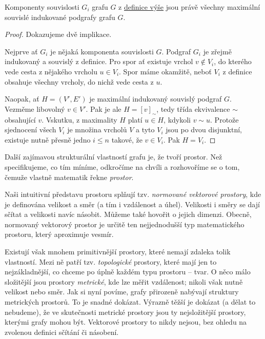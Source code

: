 \begin{observation}
 Komponenty souvislosti $G_i$ grafu $G$ z
 \hyperref[def:komponenta-souvislosti]{definice výše} jsou právě všechny
 maximální souvislé indukované podgrafy grafu $G$.
\end{observation}
\begin{proof}
 Dokazujeme dvě implikace.

 Nejprve ať $G_i$ je nějaká komponenta souvislosti $G$. Podgraf $G_i$ je zřejmě
 indukovaný a souvislý z definice. Pro spor ať existuje vrchol $v \notin V_i$,
 do kterého vede cesta z nějakého vrcholu $u \in V_i$. Spor máme okamžitě, neboť
 $V_i$ z definice obsahuje všechny vrcholy, do nichž vede cesta z $u$. 

 Naopak, ať $H = (V',E')$ je maximální indukovaný souvislý podgraf $G$. Vezměme
 libovolný $v \in V'$. Pak je ale $H = [v]_{ \sim }$, tedy třída ekvivalence $
 \sim $ obsahující $v$. Vskutku, z maximality $H$ platí $u \in H$, kdykoli $v
 \sim u$. Protože sjednocení všech $V_i$ je množina vrcholů $V$ a tyto $V_i$
 jsou po dvou disjunktní, existuje nutně přesně jedno $i \leq n$ takové, že $v
 \in V_i$. Pak $H = V_i$.
\end{proof}

Další zajímavou strukturální vlastností grafu je, že tvoří prostor. Než
specifikujeme, co tím míníme, odkročíme na chvíli a rozhovoříme se o tom, čemuže
vlastně matematik řekne \emph{prostor}.

Naši intuitivní představu prostoru splňují tzv. \emph{normované vektorové
prostory}, kde je definována velikost a směr (a tím i vzdálenost a úhel).
Velikosti i směry se dají sčítat a velikosti navíc násobit. Můžeme také hovořit
o jejich dimenzi. Obecně, normovaný vektorový prostor je určitě ten
nejjednodušší typ matematického prostoru, který aproximuje vesmír.

Existují však mnohem primitivnější prostory, které nemají zdaleka tolik
 vlastností. Mezi ně patří tzv. \emph{topologické} prostory,
které mají jen to nejzákladnější, co chceme po úplně každém typu prostoru --
tvar. O něco málo složitější jsou prostory \emph{metrické}, kde lze měřit
vzdálenost; nikoli však nutně velikost nebo směr. Jak si nyní povíme, grafy
přirozeně nabývají struktury metrických prostorů. To je snadné dokázat. Výrazně
těžší je dokázat (a dělat to nebudeme), že ve skutečnosti metrické prostory jsou
ty nejsložitější prostory, kterými grafy mohou být. Vektorové prostory to nikdy
nejsou, bez ohledu na zvolenou definici sčítání či násobení.

